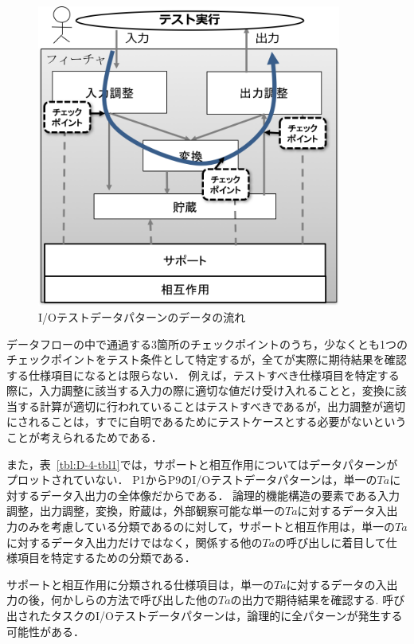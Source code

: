  \begin{figure}[htbp]
 \begin{center}
 \includegraphics[width=10cm]{./image/D-4-Fig7.png}
 \caption{I/Oテストデータパターンのデータの流れ}
 \label{fig:D-4-Fig7}
 \end{center}
 \end{figure}

データフローの中で通過する3箇所のチェックポイントのうち，少なくとも1つのチェックポイントをテスト条件として特定するが，全てが実際に期待結果を確認する仕様項目になるとは限らない．
例えば，テストすべき仕様項目を特定する際に，入力調整に該当する入力の際に適切な値だけ受け入れることと，変換に該当する計算が適切に行われていることはテストすべきであるが，出力調整が適切にされることは，すでに自明であるためにテストケースとする必要がないということが考えられるためである．

また，表~\ref{tbl:D-4-tbl1}では，サポートと相互作用についてはデータパターンがプロットされていない．
P1からP9のI/Oテストデータパターンは，単一の$Ta$に対するデータ入出力の全体像だからである．
論理的機能構造の要素である入力調整，出力調整，変換，貯蔵は，外部観察可能な単一の$Ta$に対するデータ入出力のみを考慮している分類であるのに対して，サポートと相互作用は，単一の$Ta$に対するデータ入出力だけではなく，関係する他の$Ta$の呼び出しに着目して仕様項目を特定するための分類である．

サポートと相互作用に分類される仕様項目は，単一の$Ta$に対するデータの入出力の後，何かしらの方法で呼び出した他の$Ta$の出力で期待結果を確認する.
呼び出されたタスクのI/Oテストデータパターンは，論理的に全パターンが発生する可能性がある．


